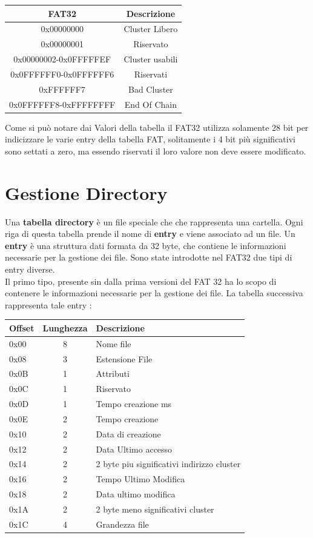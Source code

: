     \begin{center}
\begin{tabular}{|c|c|}\hline
\textbf {FAT32} & \textbf{Descrizione}\\\hline
0x00000000 & Cluster Libero\\\hline
0x00000001 & Riservato\\\hline
0x00000002-0x0FFFFFEF & Cluster usabili\\\hline
0x0FFFFFF0-0x0FFFFFF6 & Riservati\\\hline
0xFFFFFF7 & Bad Cluster\\\hline
0x0FFFFFF8-0xFFFFFFFF & End Of Chain\\\hline
    \end{tabular}
    \end{center}

Come si può notare dai Valori della tabella il FAT32 utilizza solamente 28 bit per indicizzare le varie entry della tabella FAT, solitamente i 4 bit più significativi sono settati a zero, ma essendo riservati il loro valore non deve essere modificato. 

    \section{Gestione Directory}
    \label{gest:dir}
Una \textbf{tabella directory} è un file speciale che che rappresenta una cartella.
Ogni riga di questa tabella prende il nome di \textbf{entry} e viene associato ad un file.  Un \textbf{entry} è una struttura dati formata da 32 byte, che contiene le informazioni necessarie per la gestione dei file. 
Sono state introdotte nel FAT32 due tipi di entry diverse. \\
Il primo tipo, presente sin dalla prima versioni del FAT 32 ha lo scopo di contenere le informazioni necessarie per la gestione dei file. La tabella successiva rappresenta tale entry : 

\begin{center}
\begin{tabular}{|l|c|l|}\hline
\textbf{Offset} & \textbf{Lunghezza} & \textbf{Descrizione}\\\hline
0x00 & 8 & Nome file\\\hline
0x08 & 3 & Estensione File\\\hline
0x0B & 1 & Attributi\\\hline
0x0C & 1 & Riservato\\\hline
0x0D & 1 & Tempo creazione ms\\\hline
0x0E & 2 & Tempo creazione\\\hline
0x10 & 2 & Data di creazione\\\hline
0x12 & 2 & Data Ultimo accesso\\\hline
0x14 & 2 & 2 byte piu significativi indirizzo cluster\\\hline
0x16 & 2 & Tempo Ultimo Modifica\\\hline
0x18 & 2 & Data ultimo modifica\\\hline
0x1A & 2 & 2 byte meno significativi cluster\\\hline
0x1C & 4 & Grandezza file\\\hline
\end{tabular}
\end{center}

